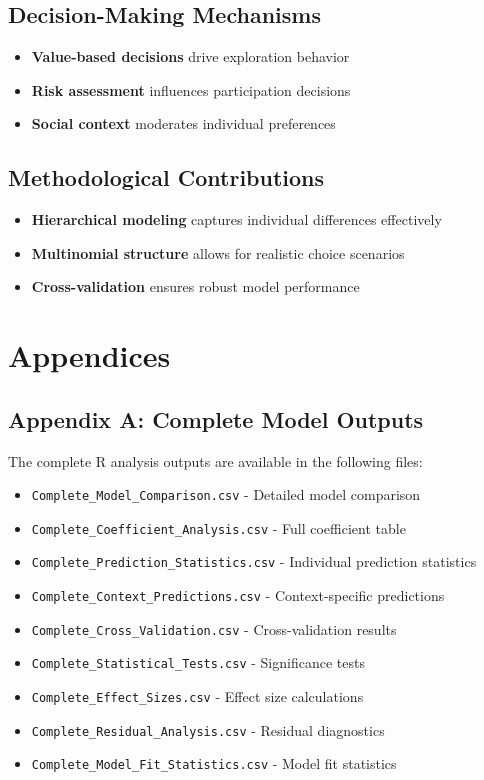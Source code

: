 \documentclass[11pt]{article}
\begin{document}
\subsection{Decision-Making Mechanisms}
\begin{itemize}
    \item \textbf{Value-based decisions} drive exploration behavior
    \item \textbf{Risk assessment} influences participation decisions
    \item \textbf{Social context} moderates individual preferences
\end{itemize}

\subsection{Methodological Contributions}
\begin{itemize}
    \item \textbf{Hierarchical modeling} captures individual differences effectively
    \item \textbf{Multinomial structure} allows for realistic choice scenarios
    \item \textbf{Cross-validation} ensures robust model performance
\end{itemize}

\section{Appendices}

\subsection{Appendix A: Complete Model Outputs}

The complete R analysis outputs are available in the following files:
\begin{itemize}
    \item \texttt{Complete\_Model\_Comparison.csv} - Detailed model comparison
    \item \texttt{Complete\_Coefficient\_Analysis.csv} - Full coefficient table
    \item \texttt{Complete\_Prediction\_Statistics.csv} - Individual prediction statistics
    \item \texttt{Complete\_Context\_Predictions.csv} - Context-specific predictions
    \item \texttt{Complete\_Cross\_Validation.csv} - Cross-validation results
    \item \texttt{Complete\_Statistical\_Tests.csv} - Significance tests
    \item \texttt{Complete\_Effect\_Sizes.csv} - Effect size calculations
    \item \texttt{Complete\_Residual\_Analysis.csv} - Residual diagnostics
    \item \texttt{Complete\_Model\_Fit\_Statistics.csv} - Model fit statistics
\end{itemize}
\end{document}
